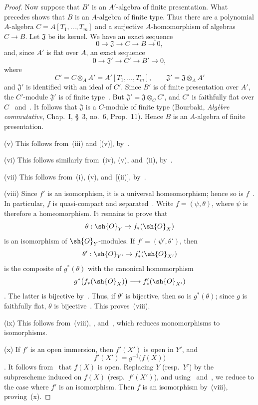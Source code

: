 \begin{proof}
Now suppose that $B'$ is an $A'$-algebra of finite presentation. What
precedes shows that $B$ is an $A$-algebra of finite type. Thus there
are a polynomial $A$-algebra $C=A[T_1,\ldots,T_m]$ and a surjective
$A$-homomorphism of algebras $C\to B$. Let $\mathfrak{J}$ be its
kernel. We have an exact sequence
\[
  0\to\mathfrak{J}\to C\to B\to0,
\]
and, since $A'$ is flat over $A$, an exact sequence
\[
  0\to\mathfrak{J}'\to C'\to B'\to0,
\]
where
\[
  C'=C\otimes_A A'=A'[T_1,\ldots,T_m],
  \qquad
  \mathfrak{J}'=\mathfrak{J}\otimes_A A'
\]
and $\mathfrak{J}'$ is identified with an ideal of $C'$. Since $B'$ is
of finite presentation over $A'$, the $C'$-module $\mathfrak{J}'$ is
of finite type~. But
$\mathfrak{J}'=\mathfrak{J}\otimes_C C'$, and $C'$ is faithfully flat
over $C$~ and~. It follows that
$\mathfrak{J}$ is a $C$-module of finite type
\textnormal{(}Bourbaki, \emph{Alg\`ebre commutative}, Chap.~I, \S~3,
no.~6, Prop.~11\textnormal{)}. Hence $B$ is an $A$-algebra of finite
presentation.

\textnormal{(v)} This follows from~\textnormal{(iii)} and
[(v)], by~.

\textnormal{(vi)} This follows similarly from~\textnormal{(iv)},
\textnormal{(v)}, and~\textnormal{(ii)}, by~.

\textnormal{(vii)} This follows from~\textnormal{(i)},
\textnormal{(v)}, and~[(ii)], by~.

\textnormal{(viii)} Since $f'$ is an isomorphism, it is a universal
homeomorphism; hence so is $f$~. In particular, $f$ is
quasi-compact and separated~. Write
$f=(\psi,\theta)$, where $\psi$ is therefore a homeomorphism. It remains
to prove that
\[
  \theta:\sh{O}_Y\to f_*(\sh{O}_X)
\]
is an isomorphism of $\sh{O}_Y$-modules. If
$f'=(\psi',\theta')$, then
\[
  \theta':\sh{O}_{Y'}\to f'_*(\sh{O}_{X'})
\]
is the composite of $g^*(\theta)$ with the canonical homomorphism
\[
  g^*\bigl(f_*(\sh{O}_X)\bigr)\longrightarrow f'_*(\sh{O}_{X'})
\]
. The latter is bijective by~. Thus,
if $\theta'$ is bijective, then so is $g^*(\theta)$; since $g$ is
faithfully flat, $\theta$ is bijective~. This
proves~\textnormal{(viii)}.

\textnormal{(ix)} This follows from~\textnormal{(viii)},
, and~, which reduces
monomorphisms to isomorphisms.

\textnormal{(x)} If $f'$ is an open immersion, then $f'(X')$ is open
in $Y'$, and
\[
  f'(X')=g^{-1}\bigl(f(X)\bigr)
\]
. It follows from~ that $f(X)$ is
open. Replacing $Y$ \textnormal{(}resp.\ $Y'$\textnormal{)} by the
subprescheme induced on $f(X)$ \textnormal{(}resp.\ $f'(X')$\textnormal{)},
and using~ and~, we reduce to the case
where $f'$ is an isomorphism. Then $f$ is an isomorphism
by~\textnormal{(viii)}, proving~\textnormal{(x)}.


\end{proof}
